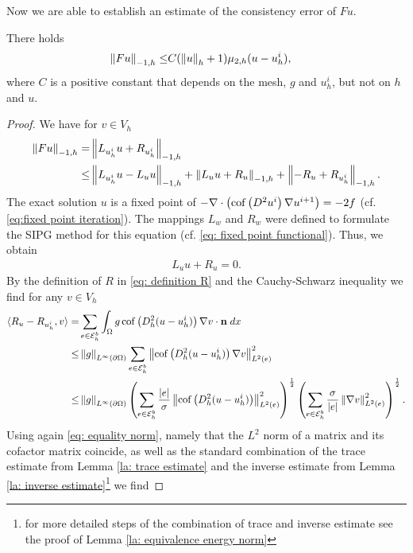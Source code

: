 Now we are able to establish an estimate of the consistency error of $Fu$.
\begin{theorem} \label{la: consistency error F}
	There holds
	\begin{align*}
	\left\lVert Fu \right\rVert_{-1,h} \leq& C (\left\lVert u \right\rVert_{h}+1)\mu_{2,h}(u-u_h^i),
	\end{align*}
	where $C$ is a positive constant that depends on the mesh, $g$ and $u^i_h$, but not on $h$ and $u$. 
\end{theorem}
\begin{proof}
	We have for $v \in V_h$
	\begin{align}
	\left\lVert Fu \right\rVert_{-1,h} =& \left\lVert  L_{u^i_h}u + R_{u^i_h} \right\rVert_{-1,h} \nonumber\\
	\leq& \left\lVert  L_{u^i_h}u - L_u u \right\rVert_{-1,h} + \left\lVert  L_{u}u + R_u \right\rVert_{-1,h} + \left\lVert  -R_u + R_{u^i_h} \right\rVert_{-1,h}. \label{eq: Fu first estimate}
	\end{align}	
	The exact solution $u$ is a fixed point of $- \nabla \cdot \left( \operatorname{cof} \left(  D^2 u^i \right) \nabla u^{i+1} \right)  = -2f$ (cf. \eqref{eq:fixed point iteration}). The mappings $L_w$ and $R_w$ were defined to formulate the SIPG method for this equation (cf. \eqref{eq: fixed point functional}). Thus, we obtain
	\begin{align}
	L_{u} u + R_u = 0. \label{eq: right solution L+U}
	\end{align}
	By the definition of $R$ in \eqref{eq: definition R} and the Cauchy-Schwarz inequality we find for any $v \in V_h$ 
	\begin{align}
	 \langle R_u - R_{u^i_h}, v \rangle 
	=& \sum_{e \in \mathcal{E}_h^b} \int_{\Omega} {{g \operatorname{cof} \left( D_h^2 (u-u_h^i) \right) \nabla v \cdot \mathbf n }\;dx}\nonumber \\
	\leq& \left\lVert g \right\rVert_{L^\infty(\partial \Omega)}
		\sum_{e \in \mathcal{E}_h^b} \left\lVert  \operatorname{cof} \left( D_h^2 (u-u_h^i) \right) \nabla v  \right\rVert_{L^2(e)}^2 \nonumber \\
	\leq& \left\lVert g \right\rVert_{L^\infty(\partial \Omega)}
		\left( \sum_{e \in \mathcal{E}_h^b} \frac {|e|} \sigma \left\lVert  \operatorname{cof} \left( D_h^2 (u-u_h^i) \right) \right\rVert_{L^2(e)}^2  \right)^{\frac 1 2}
		\left( \sum_{e \in \mathcal{E}_h^b} \frac \sigma {|e|} \left\lVert \nabla v  \right\rVert_{L^2(e)}^2  \right)^{\frac 1 2}. \label{eq: R first estimate}
	\end{align}
	Using again \eqref{eq: equality norm}, namely that the $L^2$ norm of a matrix and its cofactor matrix coincide, as well as the standard combination of the trace estimate from Lemma \ref{la: trace estimate} and the inverse estimate from Lemma \ref{la: inverse estimate}\footnote{for more detailed steps of the combination of trace and inverse estimate see the proof of Lemma \ref{la: equivalence energy norm}} we find

\end{proof}
